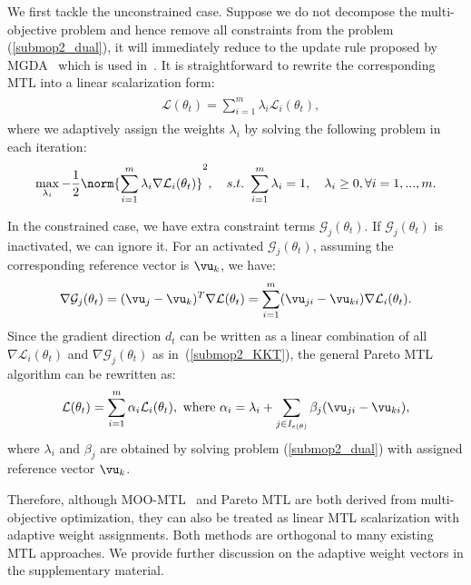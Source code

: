We first tackle the unconstrained case. Suppose we do not decompose the multi-objective problem and hence remove all constraints from the problem (\ref{submop2_dual}), it will immediately reduce to the update rule proposed by MGDA~\cite{desideri2012mutiple} which is used in~\cite{sener2018multi}. It is straightforward to rewrite the corresponding MTL into a linear scalarization form:
\begin{eqnarray}
    \label{update_mtl_nc}
    \begin{aligned}
        & \mathcal{L}(\theta_t) = \sum_{i=1}^{m} \lambda_i  \mathcal{L}_i(\theta_t),
    \end{aligned}
\end{eqnarray}
where we adaptively assign the weights $\lambda_i$ by solving the following problem in each iteration:
\begin{eqnarray}
    \label{submop2_dual_nc}
        \max_{\lambda_i} -\frac{1}{2}\norm{\sum_{i=1}^{m} \lambda_i \nabla \mathcal{L}_i(\theta_t)}^2, ~~~
         s.t.~ \sum_{i=1}^{m} \lambda_i = 1, ~~~ \lambda_i \geq 0, \forall i = 1,...,m.
\end{eqnarray}

In the constrained case, we have extra constraint terms $ \mathcal{G}_j(\theta_t)$.  If $\mathcal{G}_j(\theta_t)$ is inactivated, we can ignore it. For an activated $\mathcal{G}_j(\theta_t)$, assuming the corresponding reference vector is $\vu_k$, we have:
\begin{eqnarray}
    \label{g_act}
    \nabla \mathcal{G}_j(\theta_t)  = (  \vu_j -\vu_k)^T \nabla \mathcal{L}(\theta_t) = \sum_{i=1}^{m} (\vu_{ji} - \vu_{ki}) \nabla \mathcal{L}_i(\theta_t).
\end{eqnarray}
Since the gradient direction $d_t$ can be written as a linear combination of all $\nabla \mathcal{L}_i(\theta_t)$ and $\nabla \mathcal{G}_j(\theta_t)$ as in~(\ref{submop2_KKT}), the general Pareto MTL algorithm can be rewritten as:
\begin{eqnarray}
    \label{update_mtl_c}
    \mathcal{L}(\theta_t) = \sum_{i=1}^{m} \alpha_i  \mathcal{L}_i(\theta_t), ~\text{where }  \alpha_i = \lambda_i + \sum_{j \in I_{\epsilon(\theta)}} \beta_j (\vu_{ji} - \vu_{ki}),
\end{eqnarray}
where $\lambda_i$ and $\beta_j$ are obtained by solving problem (\ref{submop2_dual}) with assigned reference vector $\vu_{k}$.

Therefore, although MOO-MTL~\cite{sener2018multi} and Pareto MTL are both derived from multi-objective optimization, they can also be treated as linear MTL scalarization with adaptive weight assignments. Both methods are orthogonal to many existing MTL approaches. We provide further discussion on the adaptive weight vectors in the supplementary material.

